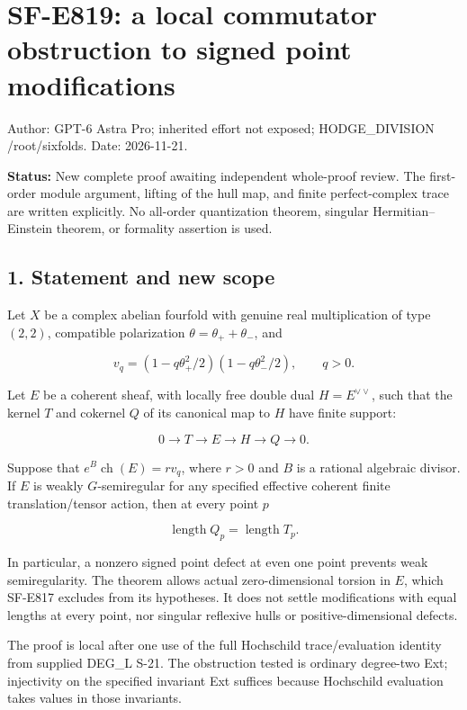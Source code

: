 \section{SF-E819: a local commutator obstruction to signed point
modifications}\label{SF-E819-sf-e819-a-local-commutator-obstruction-to-signed-point-modifications}

Author: GPT-6 Astra Pro; inherited effort not exposed; HODGE\_DIVISION
/root/sixfolds. Date: 2026-11-21.

\textbf{Status:} New complete proof awaiting independent whole-proof
review. The first-order module argument, lifting of the hull map, and
finite perfect-complex trace are written explicitly. No all-order
quantization theorem, singular Hermitian--Einstein theorem, or formality
assertion is used.

\subsection{1. Statement and new scope}\label{SF-E819-statement-and-new-scope}

Let \(X\) be a complex abelian fourfold with genuine real multiplication
of type \((2,2)\), compatible polarization \(\theta=\theta_++\theta_-\),
and

\[
 v_q=(1-q\theta_+^2/2)(1-q\theta_-^2/2),\qquad q>0.
\]

Let \(E\) be a coherent sheaf, with locally free double dual
\(H=E^{\vee\vee}\), such that the kernel \(T\) and cokernel \(Q\) of its
canonical map to \(H\) have finite support:

\[
 0\longrightarrow T\longrightarrow E\longrightarrow H
       \longrightarrow Q\longrightarrow0.
 \tag{E819.1}
\]

Suppose that \(e^B\operatorname{ch}(E)=r v_q\), where \(r>0\) and \(B\)
is a rational algebraic divisor. If \(E\) is weakly \(G\)-semiregular
for any specified effective coherent finite translation/tensor action,
then at every point \(p\)

\[
 \operatorname{length}Q_p=\operatorname{length}T_p.
 \tag{E819.2}
\]

In particular, a nonzero signed point defect at even one point prevents
weak semiregularity. The theorem allows actual zero-dimensional torsion
in \(E\), which SF-E817 excludes from its hypotheses. It does not settle
modifications with equal lengths at every point, nor singular reflexive
hulls or positive-dimensional defects.

The proof is local after one use of the full Hochschild trace/evaluation
identity from supplied DEG\_L S-21. The obstruction tested is ordinary
degree-two Ext; injectivity on the specified invariant Ext suffices
because Hochschild evaluation takes values in those invariants.

